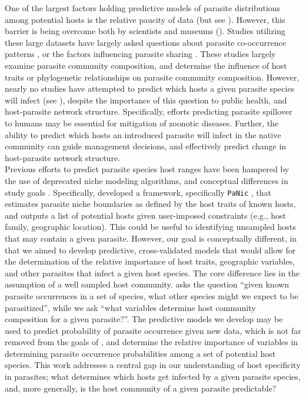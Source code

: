 \documentclass[12pt]{article}
\begin{document}

One of the largest factors holding predictive models of parasite distributions among potential hosts is the relative paucity of data (but see \cite{strona2012}). However, this barrier is being overcome both by scientists \cite{strona2012, nunn2005} and museums (\cite{gibson2005}). Studies utilizing these large datasets have largely asked questions about parasite co-occurrence patterns \cite{strona2013}, or the factors influencing parasite sharing \cite{braga2014, dallas2014b}. These studies largely examine parasite community composition, and determine the influence of host traits or phylogenetic relationships on parasite community composition. However, nearly no studies have attempted to predict which hosts a given parasite species will infect (see \cite{strona2012panic}), despite the importance of this question to public health, and host-parasite network structure. Specifically, efforts predicting parasite spillover to humans may be essential for mitigation of zoonotic diseases. Further, the ability to predict which hosts an introduced parasite will infect in the native community can guide management decisions, and effectively predict change in host-parasite network structure. \\

Previous efforts to predict parasite species host ranges have been hampered by the use of deprecated niche modeling algorithms, and conceptual differences in study goals \cite{strona2012}. Specifically, \cite{strona2012} developed a framework, specifically \texttt{PaNic} \cite{strona2012panic}, that estimates parasite niche boundaries as defined by the host traits of known hosts, and outputs a list of potential hosts given user-imposed constraints (e.g., host family, geographic location). This could be useful to identifying unsampled hosts that may contain a given parasite. However, our goal is conceptually different, in that we aimed to develop predictive, cross-validated models that would allow for the determination of the relative importance of host traits, geographic variables, and other parasites that infect a given host species. The core difference lies in the assumption of a well sampled host community. \cite{strona2012panic} asks the question ``given known parasite occurrences in a set of species, what other species might we expect to be parasitized'', while we ask ``what variables determine host community composition for a given parasite?''. The predictive models we develop may be used to predict probability of parasite occurrence given new data, which is not far removed from the goals of \cite{strona2012panic}, and determine the relative importance of variables in determining parasite occurrence probabilities among a set of potential host species. This work addresses a central gap in our understanding of host specificity in parasites; what determines which hosts get infected by a given parasite species, and, more generally, is the host community of a given parasite predictable? \\ 
 
\end{document}
